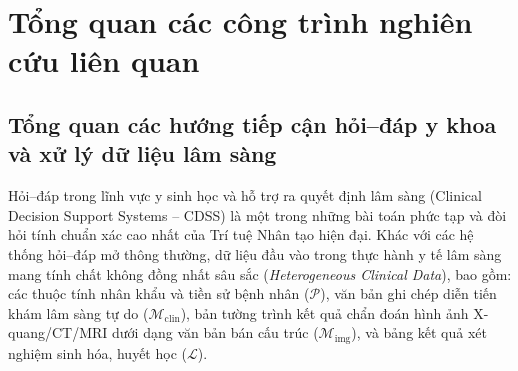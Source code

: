 \chapter{Tổng quan các công trình nghiên cứu liên quan}
\label{chap:chapter2_proposed}

\section{Tổng quan các hướng tiếp cận hỏi--đáp y khoa và xử lý dữ liệu lâm sàng}

Hỏi--đáp trong lĩnh vực y sinh học và hỗ trợ ra quyết định lâm sàng (Clinical Decision Support Systems -- CDSS) là một trong những bài toán phức tạp và đòi hỏi tính chuẩn xác cao nhất của Trí tuệ Nhân tạo hiện đại. Khác với các hệ thống hỏi--đáp mở thông thường, dữ liệu đầu vào trong thực hành y tế lâm sàng mang tính chất không đồng nhất sâu sắc (\emph{Heterogeneous Clinical Data}), bao gồm: các thuộc tính nhân khẩu và tiền sử bệnh nhân ($\mathcal{P}$), văn bản ghi chép diễn tiến khám lâm sàng tự do ($\mathcal{M}_{\mathrm{clin}}$), bản tường trình kết quả chẩn đoán hình ảnh X-quang/CT/MRI dưới dạng văn bản bán cấu trúc ($\mathcal{M}_{\mathrm{img}}$), và bảng kết quả xét nghiệm sinh hóa, huyết học ($\mathcal{L}$).

